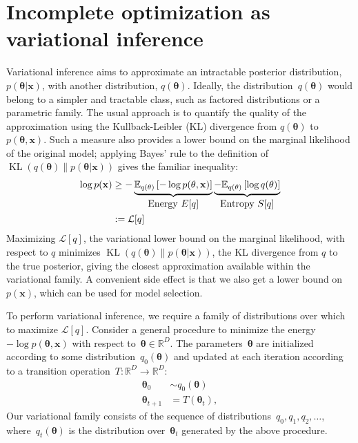 \documentclass[]{article}
\newcommand{\vx}{\mathbf{x}}
\newcommand{\expectargs}[2]{\mathbb{E}_{#1} \left[ {#2} \right]}
\newcommand{\varL}{\mathcal{L}}
\DeclareMathOperator{\KLop}{KL}
\newcommand{\KL}[2]{\KLop \left(#1 \middle \| #2 \right)}
\newcommand{\data}{\vx}
\newcommand{\params}{\mathbf{\theta}}
\newcommand{\trans}{T}
\newcommand{\jointdist}{p(\params , \data)}
\newcommand{\posterior}{p(\params | \data)}
\newcommand{\reals}{\mathbb{R}}
\begin{document}
\section{Incomplete optimization as variational inference}
\label{sec:techintro}
Variational inference \citep{wainwright2008graphical} 
aims to approximate an intractable posterior distribution, $\posterior$, with another distribution, $q(\params)$.
Ideally, the distribution~$q(\params)$ would belong to a simpler and tractable class, such as factored distributions or a parametric family.
The usual approach is to quantify the quality of the approximation using the Kullback-Leibler (KL) divergence from $q(\params)$ to $\jointdist$.
Such a measure also provides a lower bound on the marginal likelihood of the original model;
applying Bayes' rule to the definition of $\KL{q(\params)}{\posterior}$ gives the familiar inequality:
%
\begin{align}
\log p(\data)
& \geq - \underbrace{\expectargs{q(\params)}{ -\log \jointdist }}_{\textnormal{\normalsize Energy $E[q]$}}
         \underbrace{- \expectargs{q(\params)}{\log  q(\params)}}_{\textnormal{\normalsize Entropy $S[q]$}} \nonumber \\
& := \varL[q] \label{eq:varbound}
\end{align}
%
Maximizing $\varL[q]$, the variational lower bound on the marginal likelihood, with respect to $q$ minimizes $\KL{q(\params)}{\posterior}$, the KL divergence from $q$ to the true posterior, giving the closest approximation available within the variational family.
A convenient side effect is that we also get a lower bound on $p(\data)$, which can be used for model selection.

To perform variational inference, we require a family of distributions over which to maximize $\varL[q]$. 
Consider a general procedure to minimize the energy~$-\log\jointdist$ with respect to~${\params \in \reals^D}$.
The parameters~$\params$ are initialized according to some distribution~$q_0(\params)$ and updated at each iteration according to a transition operation~${\trans : \reals^D \rightarrow \reals^D}$:
%
\begin{align}
\params_0 &\sim q_0(\params) \nonumber \\
\params_{t + 1} &= \trans(\params_t), \nonumber
\end{align}
%
Our variational family consists of the sequence of distributions~$q_0, q_1, q_2, \ldots$,
where~$q_t(\params)$ is the distribution over~$\params_t$ generated by the above procedure.
\end{document}

